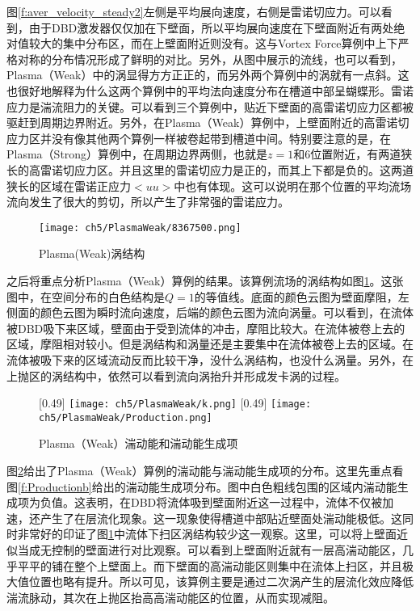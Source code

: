 图\ref{f:aver_velocity_steady2}左侧是平均展向速度，右侧是雷诺切应力。可以看到，由于DBD激发器仅仅加在下壁面，所以平均展向速度在下壁面附近有两处绝对值较大的集中分布区，而在上壁面附近则没有。这与Vortex Force算例中上下严格对称的分布情况形成了鲜明的对比。另外，从图中展示的流线，也可以看到，Plasma（Weak）中的涡显得方方正正的，而另外两个算例中的涡就有一点斜。这也很好地解释为什么这两个算例中的平均法向速度分布在槽道中部呈蝴蝶形。雷诺应力是湍流阻力的关键。可以看到三个算例中，贴近下壁面的高雷诺切应力区都被驱赶到周期边界附近。另外，在Plasma（Weak）算例中，上壁面附近的高雷诺切应力区并没有像其他两个算例一样被卷起带到槽道中间。特别要注意的是，在Plasma（Strong）算例中，在周期边界两侧，也就是$z=1$和6位置附近，有两道狭长的高雷诺切应力区。并且这里的雷诺切应力是正的，而其上下都是负的。这两道狭长的区域在雷诺正应力$<uu>$中也有体现。这可以说明在那个位置的平均流场流向发生了很大的剪切，所以产生了非常强的雷诺应力。

\begin{figure}[htb]
  \centering
  \texttt{[image: ch5/PlasmaWeak/8367500.png]}
  \caption{Plasma(Weak)涡结构}\label{f:PlasmaWeak_vortexstructure}
\end{figure}
之后将重点分析Plasma（Weak）算例的结果。该算例流场的涡结构如图\ref{f:PlasmaWeak_vortexstructure}。这张图中，在空间分布的白色结构是$Q=1$的等值线。底面的颜色云图为壁面摩阻，左侧面的颜色云图为瞬时流向速度，后端的颜色云图为流向涡量。可以看到，在流体被DBD吸下来区域，壁面由于受到流体的冲击，摩阻比较大。在流体被卷上去的区域，摩阻相对较小。但是涡结构和涡量还是主要集中在流体被卷上去的区域。在流体被吸下来的区域流动反而比较干净，没什么涡结构，也没什么涡量。另外，在上抛区的涡结构中，依然可以看到流向涡抬升并形成发卡涡的过程。

\begin{figure}
  \centering
  [0.49\textwidth]
    {\texttt{[image: ch5/PlasmaWeak/k.png]}}
  [0.49\textwidth]
    {\texttt{[image: ch5/PlasmaWeak/Production.png]}}
  \caption{Plasma（Weak）湍动能和湍动能生成项}\label{f:production}
\end{figure}
图\ref{f:production}给出了Plasma（Weak）算例的湍动能与湍动能生成项的分布。这里先重点看图\ref{f:Productionb}给出的湍动能生成项分布。图中白色粗线包围的区域内湍动能生成项为负值。这表明，在DBD将流体吸到壁面附近这一过程中，流体不仅被加速，还产生了在层流化现象。这一现象使得槽道中部贴近壁面处湍动能极低。这同时非常好的印证了图\ref{f:PlasmaWeak_vortexstructure}中流体下扫区涡结构较少这一观察。这里，可以将上壁面近似当成无控制的壁面进行对比观察。可以看到上壁面附近就有一层高湍动能区，几乎平平的铺在整个上壁面上。而下壁面的高湍动能区则集中在流体上扫区，并且极大值位置也略有提升。所以可见，该算例主要是通过二次涡产生的层流化效应降低湍流脉动，其次在上抛区抬高高湍动能区的位置，从而实现减阻。

